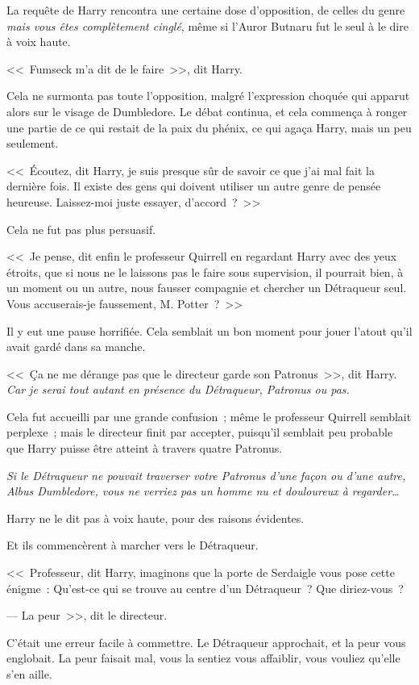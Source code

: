 \later

La requête de Harry rencontra une certaine dose d'opposition, de celles du genre \emph{mais vous êtes complètement cinglé}, même si l'Auror Butnaru fut le seul à le dire à voix haute.

<<~Fumseck m'a dit de le faire~>>, dit Harry.

Cela ne surmonta pas toute l'opposition, malgré l'expression choquée qui apparut alors sur le visage de Dumbledore. Le débat continua, et cela commença à ronger une partie de ce qui restait de la paix du phénix, ce qui agaça Harry, mais un peu seulement.

<<~Écoutez, dit Harry, je suis presque sûr de savoir ce que j'ai mal fait la dernière fois. Il existe des gens qui doivent utiliser un autre genre de pensée heureuse. Laissez-moi juste essayer, d'accord~?~>>

Cela ne fut pas plus persuasif.

<<~Je pense, dit enfin le professeur Quirrell en regardant Harry avec des yeux étroits, que si nous ne le laissons pas le faire sous supervision, il pourrait bien, à un moment ou un autre, nous fausser compagnie et chercher un Détraqueur seul. Vous accuserais-je faussement, M. Potter~?~>>

Il y eut une pause horrifiée. Cela semblait un bon moment pour jouer l'atout qu'il avait gardé dans sa manche.

<<~Ça ne me dérange pas que le directeur garde son Patronus~>>, dit Harry. \emph{Car je serai tout autant en présence du Détraqueur, Patronus ou pas.}

Cela fut accueilli par une grande confusion~; même le professeur Quirrell semblait perplexe~; mais le directeur finit par accepter, puisqu'il semblait peu probable que Harry puisse être atteint à travers quatre Patronus.

\emph{Si le Détraqueur ne pouvait traverser votre Patronus d'une façon ou d'une autre, Albus Dumbledore, vous ne verriez pas un homme nu et douloureux à regarder…}

Harry ne le dit pas à voix haute, pour des raisons évidentes.

Et ils commencèrent à marcher vers le Détraqueur.

<<~Professeur, dit Harry, imaginons que la porte de Serdaigle vous pose cette énigme~: Qu'est-ce qui se trouve au centre d'un Détraqueur~? Que diriez-vous~?

--- La peur~>>, dit le directeur.

C'était une erreur facile à commettre. Le Détraqueur approchait, et la peur vous englobait. La peur faisait mal, vous la sentiez vous affaiblir, vous vouliez qu'elle s'en aille.

